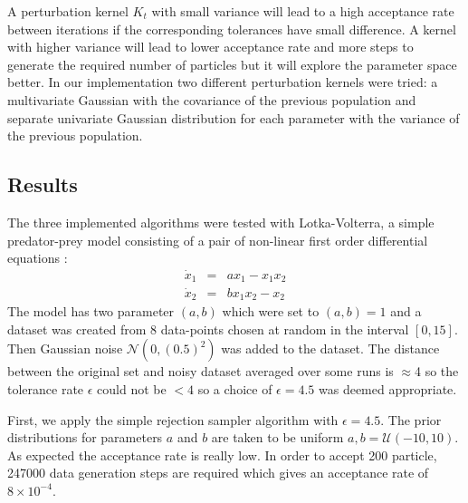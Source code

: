 \documentclass[12pt,a4paper,titlepage]{article}
\begin{document}
 A perturbation kernel $K_{t}$ with small variance will lead to a high acceptance rate between iterations if the corresponding tolerances have small difference. A kernel with higher variance will lead to lower acceptance rate and more steps to generate the required number of particles but it will explore the parameter space better\cite{filippi2011optimal}.  In our implementation two different perturbation kernels were tried: a multivariate Gaussian with the covariance of the previous population and separate univariate Gaussian distribution for each parameter with the variance of the previous population.
\subsection{Results}
The three implemented algorithms were tested with Lotka-Volterra\cite{lotka1925elements}, a simple predator-prey model consisting of a pair of non-linear first order differential equations :
\begin{eqnarray*}
\dot x_{1} & = & ax_{1} - x_{1} x_{2}\\
\dot x_{2} & =& b x_{1}x_{2} - x_{2}
\end{eqnarray*}
The model has two parameter $(a,b)$ which were set to $(a,b) = 1$ and a dataset was created from 8 data-points chosen at random in the interval $[0, 15]$. Then Gaussian noise $\mathcal{N}(0, (0.5)^2)$ was added to the dataset.  The distance between the original set and noisy dataset averaged over some runs is $\approx$4 so the tolerance rate $\epsilon$ could not be $< 4$ so a choice of $\epsilon = 4.5$ was deemed appropriate.

First, we apply the simple rejection sampler algorithm with $\epsilon = 4.5$. The prior distributions for parameters $a$ and $b$ are taken to be uniform $a, b = \mathcal{U}(-10, 10)$. As expected the acceptance rate is really low. In order to accept 200 particle, 247000 data generation steps are required which gives an acceptance rate of $8\times10^{-4}$.
\end{document}
